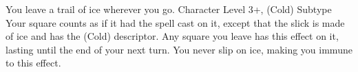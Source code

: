 \shortdescfeat
{You leave a trail of ice wherever you go.}
{Character Level 3+, (Cold) Subtype}
{Your square counts as if it had the  spell cast on it, except that the slick is made of ice and has the (Cold) descriptor.  Any square you leave has this effect on it, lasting until the end of your next turn.  You never slip on ice, making you immune to this effect.}


